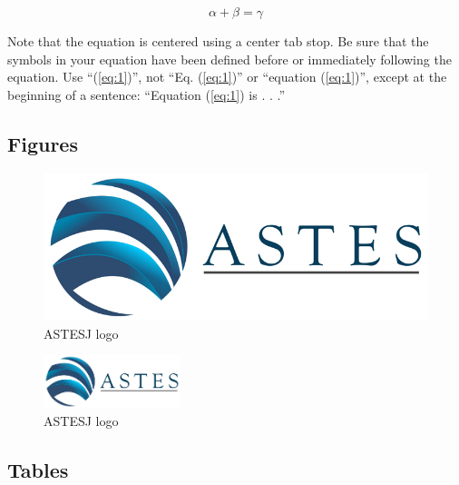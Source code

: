 \documentclass{article} %
\renewcommand{\headrulewidth}{0pt }
\begin{document}
\begin{multicols}{2}
\begin{equation}
\label{eq:1}
\alpha+\beta=\gamma
\end{equation}

Note that the equation is centered using a center tab stop. Be sure that the symbols in your equation have been defined before or immediately following the equation. Use ``(\ref{eq:1})'', not ``Eq. (\ref{eq:1})'' or ``equation (\ref{eq:1})'', except at the beginning of a sentence: ``Equation (\ref{eq:1}) is . . .''



\fancyhead{}
\renewcommand{\headrulewidth}{1pt }
\fancyfoot{}
\fancyfoot[R]{\thepage}

\subsection{Figures}

\begin{figure}[H]
	\centering
	\includegraphics[width=\linewidth]{ASTES_Logo.jpg}
	\caption{ASTESJ logo} 
		\label{astesj}
	\end{figure}

\begin{figure}[H]
	\centering
	\includegraphics[width=4cm]{ASTES_Logo.jpg}
	\caption{ASTESJ logo} 
	\label{astesj}
\end{figure}

\subsection{Tables}


\end{multicols}
\end{document}
